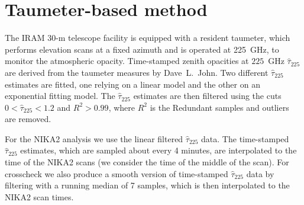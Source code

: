 \section{Taumeter-based method}%
\label{se:taumeter-method}

The IRAM 30-m telescope facility is equipped with a resident taumeter, which performs
elevation scans at a fixed azimuth and is operated at 225~GHz, to
monitor the atmospheric opacity.
Time-stamped zenith opacities at $225$~GHz $\hat{\tau}_{225}$ are derived from the
taumeter measures by Dave~L.~John. Two different $\hat{\tau}_{225}$
estimates are fitted, one relying on a linear model and the other on
an exponential fitting model. The $\hat{\tau}_{225}$ estimates are then
filtered using the cuts $0< \hat{\tau}_{225} <1.2$ and $R^2 > 0.99$, where
$R^2$ is the 
Redundant samples and outliers are removed.

For the NIKA2 analysis we use the linear filtered  $\hat{\tau}_{225}$ data.
The time-stamped $\hat{\tau}_{225}$ estimates, which are sampled about
every 4 minutes, are interpolated to the time of the NIKA2 scans (we
consider the time of the middle of the scan). For crosscheck we also
produce a smooth version of time-stamped $\hat{\tau}_{225}$ data by
filtering with a running median of 7 samples, which is then
interpolated to the NIKA2 scan times.


